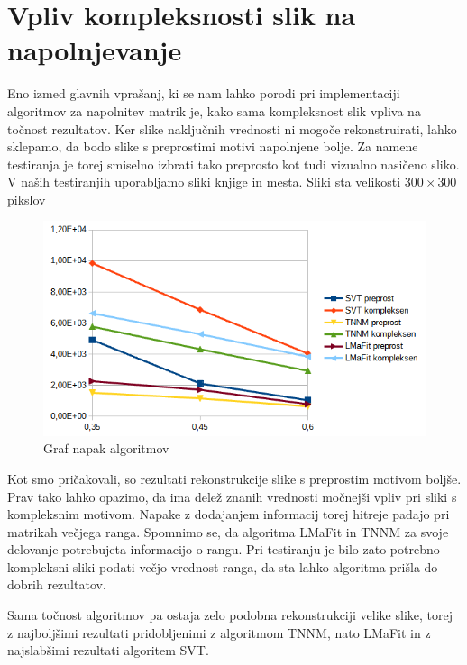\section{Vpliv kompleksnosti slik na napolnjevanje}
Eno izmed glavnih vprašanj, ki se nam lahko porodi pri implementaciji algoritmov za napolnitev matrik je, kako sama kompleksnost slik vpliva na točnost rezultatov. Ker slike naključnih vrednosti ni mogoče rekonstruirati, lahko sklepamo, da bodo slike s preprostimi motivi napolnjene bolje. Za namene testiranja je torej smiselno izbrati tako preprosto kot tudi vizualno nasičeno sliko. V naših testiranjih uporabljamo sliki knjige in mesta. Sliki sta velikosti $300 \times 300$ pikslov

\begin{figure}[!ht]
    \centering
    \includegraphics[width=\linewidth]{Poglavja/Slike/kompleksnost/kompleksna grayscale 300/kompleksnost.png}
    \caption{Graf napak algoritmov}
\end{figure}

Kot smo pričakovali, so rezultati rekonstrukcije slike s preprostim motivom boljše. Prav tako lahko opazimo, da ima delež znanih vrednosti močnejši vpliv pri sliki s kompleksnim motivom. Napake z dodajanjem informacij torej hitreje padajo pri matrikah večjega ranga. Spomnimo se, da algoritma LMaFit in TNNM za svoje delovanje potrebujeta informacijo o rangu. Pri testiranju je bilo zato potrebno kompleksni sliki podati večjo vrednost ranga, da sta lahko algoritma prišla do dobrih rezultatov.

Sama točnost algoritmov pa ostaja zelo podobna rekonstrukciji velike slike, torej z najboljšimi rezultati pridobljenimi z algoritmom TNNM, nato LMaFit in z najslabšimi rezultati algoritem SVT.

